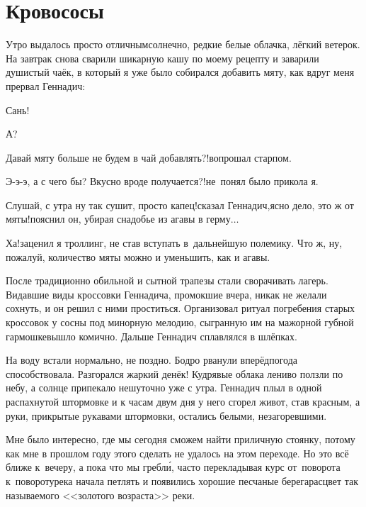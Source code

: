 \chapter{Кровососы} 
\vepsianrose

Утро выдалось просто отличным\mdash  солнечно, редкие белые облачка, лёгкий ветерок. На завтрак снова сварили шикарную кашу по моему рецепту и заварили душистый чаёк, в который я уже было собирался добавить мяту, как вдруг меня прервал Геннадич:

\diagdash Сань! 

\diagdash А?

\diagdash Давай мяту больше не будем в чай добавлять?!\mdash вопрошал старпом.

\diagdash Э-э-э, а с чего бы? Вкусно вроде получается?!\mdash не~понял было прикола я.

\diagdash Слушай, с утра ну так сушит, просто капец!\mdash сказал Геннадич,\mdash ясно дело, это ж от мяты!\mdash пояснил он, убирая снадобье из агавы в герму$\ldots$

\diagdash Ха!\mdash заценил я троллинг, не став вступать в~дальнейшую полемику. Что ж, ну, пожалуй, количество мяты можно и уменьшить, как и агавы.

После традиционно обильной и сытной трапезы стали сворачивать лагерь. Видавшие виды кроссовки Геннадича, промокшие вчера, никак не желали сохнуть, и он решил с ними проститься. Организовал ритуал погребения старых кроссовок у сосны под минорную мелодию, сыгранную им на мажорной губной гармошке\mdash вышло комично. Дальше Геннадич сплавлялся в шлёпках. 

На воду встали нормально, не поздно.  Бодро рванули вперёд\mdash погода способствовала. Разгорался жаркий денёк! Кудрявые облака лениво ползли по небу, а солнце припекало нешуточно уже с утра. Геннадич плыл в одной распахнутой штормовке и к часам двум дня у него сгорел живот, став красным, а руки, прикрытые рукавами штормовки, остались белыми, незагоревшими.

Мне было интересно, где мы сегодня сможем найти приличную стоянку, потому как мне в прошлом году этого сделать не удалось на этом переходе. Но это всё ближе к~вечеру, а пока что мы гребл\'{и}, часто перекладывая курс от~поворота к~повороту\mdash  река начала петлять и появились хорошие песчаные берега\mdash  расцвет так называемого <<золотого возраста>> реки.

